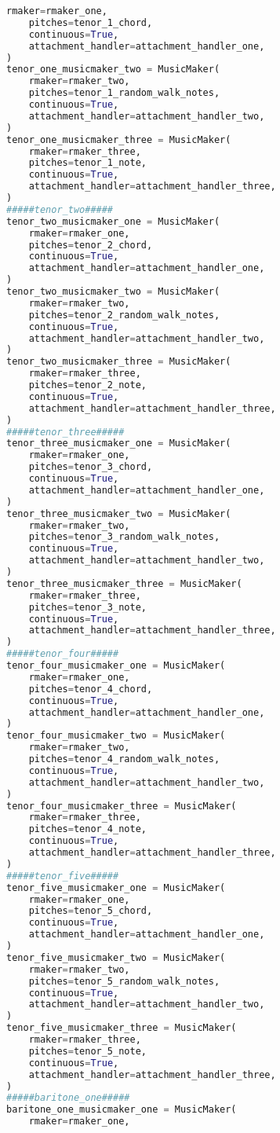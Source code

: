\begin{lstlisting}[language=Python, caption=Invocation Source Code]
    rmaker=rmaker_one,
    pitches=tenor_1_chord,
    continuous=True,
    attachment_handler=attachment_handler_one,
)
tenor_one_musicmaker_two = MusicMaker(
    rmaker=rmaker_two,
    pitches=tenor_1_random_walk_notes,
    continuous=True,
    attachment_handler=attachment_handler_two,
)
tenor_one_musicmaker_three = MusicMaker(
    rmaker=rmaker_three,
    pitches=tenor_1_note,
    continuous=True,
    attachment_handler=attachment_handler_three,
)
#####tenor_two#####
tenor_two_musicmaker_one = MusicMaker(
    rmaker=rmaker_one,
    pitches=tenor_2_chord,
    continuous=True,
    attachment_handler=attachment_handler_one,
)
tenor_two_musicmaker_two = MusicMaker(
    rmaker=rmaker_two,
    pitches=tenor_2_random_walk_notes,
    continuous=True,
    attachment_handler=attachment_handler_two,
)
tenor_two_musicmaker_three = MusicMaker(
    rmaker=rmaker_three,
    pitches=tenor_2_note,
    continuous=True,
    attachment_handler=attachment_handler_three,
)
#####tenor_three#####
tenor_three_musicmaker_one = MusicMaker(
    rmaker=rmaker_one,
    pitches=tenor_3_chord,
    continuous=True,
    attachment_handler=attachment_handler_one,
)
tenor_three_musicmaker_two = MusicMaker(
    rmaker=rmaker_two,
    pitches=tenor_3_random_walk_notes,
    continuous=True,
    attachment_handler=attachment_handler_two,
)
tenor_three_musicmaker_three = MusicMaker(
    rmaker=rmaker_three,
    pitches=tenor_3_note,
    continuous=True,
    attachment_handler=attachment_handler_three,
)
#####tenor_four#####
tenor_four_musicmaker_one = MusicMaker(
    rmaker=rmaker_one,
    pitches=tenor_4_chord,
    continuous=True,
    attachment_handler=attachment_handler_one,
)
tenor_four_musicmaker_two = MusicMaker(
    rmaker=rmaker_two,
    pitches=tenor_4_random_walk_notes,
    continuous=True,
    attachment_handler=attachment_handler_two,
)
tenor_four_musicmaker_three = MusicMaker(
    rmaker=rmaker_three,
    pitches=tenor_4_note,
    continuous=True,
    attachment_handler=attachment_handler_three,
)
#####tenor_five#####
tenor_five_musicmaker_one = MusicMaker(
    rmaker=rmaker_one,
    pitches=tenor_5_chord,
    continuous=True,
    attachment_handler=attachment_handler_one,
)
tenor_five_musicmaker_two = MusicMaker(
    rmaker=rmaker_two,
    pitches=tenor_5_random_walk_notes,
    continuous=True,
    attachment_handler=attachment_handler_two,
)
tenor_five_musicmaker_three = MusicMaker(
    rmaker=rmaker_three,
    pitches=tenor_5_note,
    continuous=True,
    attachment_handler=attachment_handler_three,
)
#####baritone_one#####
baritone_one_musicmaker_one = MusicMaker(
    rmaker=rmaker_one,

\end{lstlisting}
